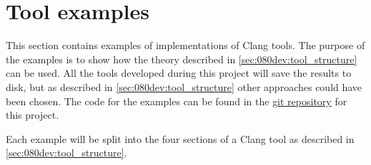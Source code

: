 \chapter{Tool examples}
This section contains examples of implementations of Clang tools. The purpose of the examples is to show how the theory described in \cref{sec:080dev:tool_structure} can be used. All the tools developed during this project will save the results to disk, but as described in \cref{sec:080dev:tool_structure} other approaches could have been chosen. The code for the examples can be found in the \href{https://github.com/mortenhaahr/RD/tree/main/examples}{git repository} for this project. 

Each example will be split into the four sections of a Clang tool as described in \cref{sec:080dev:tool_structure}. 

